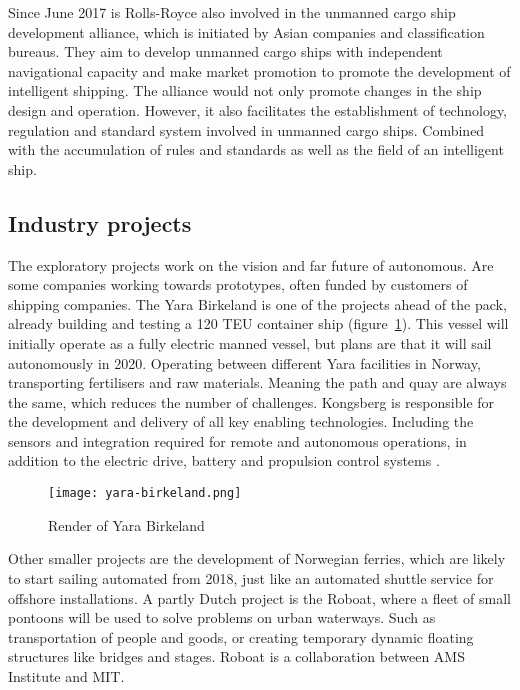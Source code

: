 Since June 2017 is Rolls-Royce also involved in the unmanned cargo ship development alliance, which is initiated by Asian companies and classification bureaus. They aim to develop unmanned cargo ships with independent navigational capacity and make market promotion to promote the development of intelligent shipping.
The alliance would not only promote changes in the ship design and operation. However, it also facilitates the establishment of technology, regulation and standard system involved in unmanned cargo ships. Combined with the accumulation of rules and standards as well as the field of an intelligent ship.

\subsection{Industry projects}
The exploratory projects work on the vision and far future of autonomous. Are some companies working towards prototypes, often funded by customers of shipping companies.
The Yara Birkeland is one of the projects ahead of the pack, already building and testing a 120 \ac{TEU} container ship (figure~\ref{fig:yara-birkeland}). This vessel will initially operate as a fully electric manned vessel, but plans are that it will sail autonomously in 2020. Operating between different Yara facilities in Norway, transporting fertilisers and raw materials. Meaning the path and quay are always the same, which reduces the number of challenges.
Kongsberg is responsible for the development and delivery of all key enabling technologies. Including the sensors and integration required for remote and autonomous operations, in addition to the electric drive, battery and propulsion control systems \cite{Sames2017}.

\begin{figure}[p]
	\centering
	\texttt{[image: yara-birkeland.png]}
	\caption{Render of Yara Birkeland}
	\label{fig:yara-birkeland}
\end{figure}

Other smaller projects are the development of Norwegian ferries, which are likely to start sailing automated from 2018, just like an automated shuttle service for offshore installations. A partly Dutch project is the Roboat, where a fleet of small pontoons will be used to solve problems on urban waterways. Such as transportation of people and goods, or creating temporary dynamic floating structures like bridges and stages. Roboat is a collaboration between AMS Institute and MIT.

